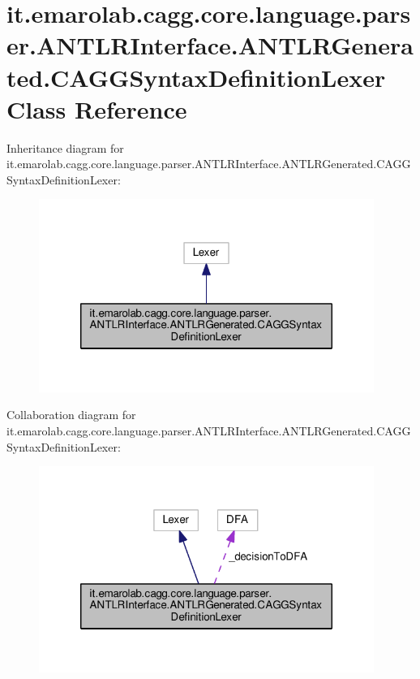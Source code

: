 \hypertarget{classit_1_1emarolab_1_1cagg_1_1core_1_1language_1_1parser_1_1ANTLRInterface_1_1ANTLRGenerated_1_1CAGGSyntaxDefinitionLexer}{\section{it.\-emarolab.\-cagg.\-core.\-language.\-parser.\-A\-N\-T\-L\-R\-Interface.\-A\-N\-T\-L\-R\-Generated.\-C\-A\-G\-G\-Syntax\-Definition\-Lexer Class Reference}
\label{classit_1_1emarolab_1_1cagg_1_1core_1_1language_1_1parser_1_1ANTLRInterface_1_1ANTLRGenerated_1_1CAGGSyntaxDefinitionLexer}
}


Inheritance diagram for it.\-emarolab.\-cagg.\-core.\-language.\-parser.\-A\-N\-T\-L\-R\-Interface.\-A\-N\-T\-L\-R\-Generated.\-C\-A\-G\-G\-Syntax\-Definition\-Lexer\-:\nopagebreak
\begin{figure}[H]
\begin{center}
\leavevmode
\includegraphics[width=310pt]{classit_1_1emarolab_1_1cagg_1_1core_1_1language_1_1parser_1_1ANTLRInterface_1_1ANTLRGenerated_1_15f19f9a4acfbe8b8ab783d7ad2b1d45}
\end{center}
\end{figure}


Collaboration diagram for it.\-emarolab.\-cagg.\-core.\-language.\-parser.\-A\-N\-T\-L\-R\-Interface.\-A\-N\-T\-L\-R\-Generated.\-C\-A\-G\-G\-Syntax\-Definition\-Lexer\-:\nopagebreak
\begin{figure}[H]
\begin{center}
\leavevmode
\includegraphics[width=310pt]{classit_1_1emarolab_1_1cagg_1_1core_1_1language_1_1parser_1_1ANTLRInterface_1_1ANTLRGenerated_1_cc6627cbb99b0cfcca550e2000055250}
\end{center}
\end{figure}
